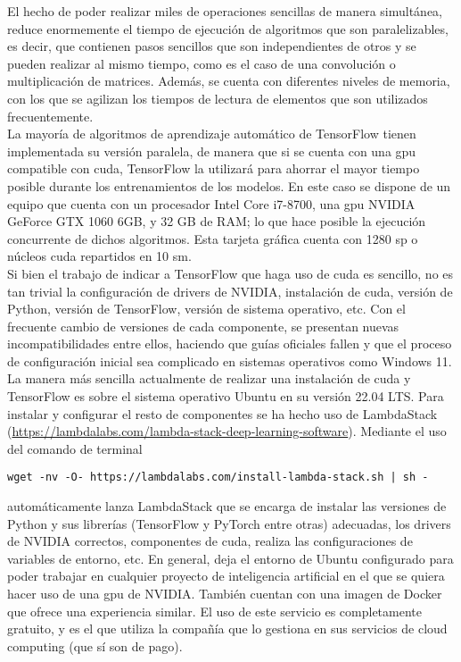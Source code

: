 			El hecho de poder realizar miles de operaciones sencillas de manera simultánea, reduce enormemente el tiempo de ejecución de algoritmos que son paralelizables, es decir, que contienen pasos sencillos que son independientes de otros y se pueden realizar al mismo tiempo, como es el caso de una convolución o multiplicación de matrices. Además, se cuenta con diferentes niveles de memoria, con los que se agilizan los tiempos de lectura de elementos que son utilizados frecuentemente. \\
			
			La mayoría de algoritmos de aprendizaje automático de TensorFlow tienen implementada su versión paralela, de manera que si se cuenta con una \gls{gpu} compatible con \gls{cuda}, TensorFlow la utilizará para ahorrar el mayor tiempo posible durante los entrenamientos de los modelos. En este caso se dispone de un equipo que cuenta con un procesador Intel Core i7-8700, una \gls{gpu} NVIDIA GeForce GTX 1060 6GB, y 32 GB de RAM; lo que hace posible la ejecución concurrente de dichos algoritmos. Esta tarjeta gráfica cuenta con 1280 \gls{sp} o núcleos \gls{cuda} repartidos en 10 \gls{sm}. \\
			
			Si bien el trabajo de indicar a TensorFlow que haga uso de \gls{cuda} es sencillo, no es tan trivial la configuración de drivers de NVIDIA, instalación de \gls{cuda}, versión de Python, versión de TensorFlow, versión de sistema operativo, etc. Con el frecuente cambio de versiones de cada componente, se presentan nuevas incompatibilidades entre ellos, haciendo que guías oficiales fallen y que el proceso de configuración inicial sea complicado en sistemas operativos como Windows 11. La manera más sencilla actualmente de realizar una instalación de \gls{cuda} y TensorFlow es sobre el sistema operativo Ubuntu en su versión 22.04 LTS. Para instalar y configurar el resto de componentes se ha hecho uso de LambdaStack (\url{https://lambdalabs.com/lambda-stack-deep-learning-software}). Mediante el uso del comando de terminal
			\begin{center}
				\begin{BVerbatim}[tabsize = 0]
					wget -nv -O- https://lambdalabs.com/install-lambda-stack.sh | sh -
				\end{BVerbatim}
			\end{center}
			automáticamente lanza LambdaStack que se encarga de instalar las versiones de Python y sus librerías (TensorFlow y PyTorch entre otras) adecuadas, los drivers de NVIDIA correctos, componentes de \gls{cuda}, realiza las configuraciones de variables de entorno, etc. En general, deja el entorno de Ubuntu configurado para poder trabajar en cualquier proyecto de inteligencia artificial en el que se quiera hacer uso de una \gls{gpu} de NVIDIA. También cuentan con una imagen de Docker que ofrece una experiencia similar. El uso de este servicio es completamente gratuito, y es el que utiliza la compañía que lo gestiona en sus servicios de cloud computing (que sí son de pago). \\
			
